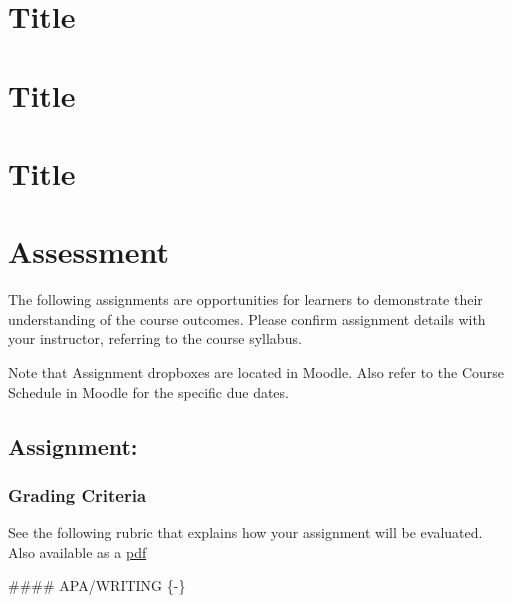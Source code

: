 \documentclass[
]{book}
\begin{document}
\hypertarget{title}{%
\chapter{Title}\label{title}}

\hypertarget{title-1}{%
\chapter{Title}\label{title-1}}

\hypertarget{title-2}{%
\chapter{Title}\label{title-2}}

\hypertarget{assessment-7}{%
\chapter*{Assessment}\label{assessment-7}}

The following assignments are opportunities for learners to demonstrate their understanding of the course outcomes. Please confirm assignment details with your instructor, referring to the course syllabus.

Note that Assignment dropboxes are located in Moodle. Also refer to the Course Schedule in Moodle for the specific due dates.

\hypertarget{assignment-3}{%
\section*{Assignment:}\label{assignment-3}}

\begin{assessment}

\end{assessment}

\hypertarget{grading-criteria-5}{%
\subsection*{Grading Criteria}\label{grading-criteria-5}}

See the following rubric that explains how your assignment will be evaluated. Also available as a \href{assets/assessment/Identity-as-a-Teacher-RUBRIC.pdf}{pdf}

\#\#\#\# APA/WRITING \{-\}
\end{document}
